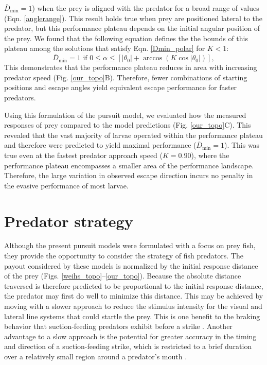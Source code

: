 \documentclass[12pt]{article}
\newcommand{\ol}{\overline}
\begin{document}
$\ol D_{\text{min}}=1$) when the prey is aligned with the predator for a broad
range of values (Eqn. \ref{anglerange}). This result holds true when prey are
positioned lateral to the predator, but this performance plateau depends on the
initial angular position of the prey. We found that the following equation
defines the  the bounds of this plateau among the solutions that satisfy Eqn.
\ref{Dmin_polar} for $K<1$:
%
\begin{equation}
\ol D_{\text{min}}=1 \text{ if }  0 \leq \alpha  \leq  [|\theta_0 |  +
\arccos(K \cos | \theta_0 |)],
 \end{equation}
%
This demonstrates that the performance plateau reduces in area with increasing
predator speed (Fig. \ref{our_topo}B). Therefore, fewer combinations of
starting positions and escape angles yield equivalent escape performance for
faster predators.

Using this formulation of the pursuit model, we evaluated how the measured
responses of prey compared to the model predictions (Fig. \ref{our_topo}C).
This revealed that the vast majority of larvae operated within the performance
plateau and therefore were predicted to yield maximal performance ($\ol
D_{\text{min}}=1$). This was true even at the fastest predator approach speed
($K=0.90$), where the performance plateau encompasses a smaller area of the
performance landscape. Therefore, the large variation in observed escape
direction incurs no penalty in the evasive performance of most larvae. 


\section{Predator strategy}

Although the present pursuit models were formulated with a focus on prey fish,
they provide the opportunity to consider the strategy of fish predators. The
payout considered by these models is normalized by the initial response
distance of the prey (Figs. \ref{weihs_topo}--\ref{our_topo}). Because the
absolute distance traversed is therefore predicted to be proportional to the
initial response distance, the predator may first do well to minimize this
distance. This may be achieved by moving with a slower approach to reduce the
stimulus intensity for the visual \citep{Dill:1974ws} and lateral line
\citep{Stewart:2014cm} systems that could startle the prey. This is one benefit
to the braking behavior that suction-feeding predators exhibit before a strike
\citep{Higham:2007go, Higham:2005iu}. Another advantage to a slow approach is
the potential for greater accuracy in the timing and direction of a
suction-feeding strike, which is restricted to a brief duration over a
relatively small region around a predator's mouth \citep{Wainwright:2001ufa}.
\end{document}
